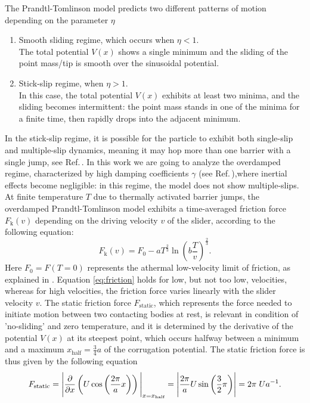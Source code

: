 The Prandtl-Tomlinson model predicts two different patterns of motion depending on the parameter $\eta$
\begin{enumerate}
    \item Smooth sliding regime, which occurs when $\eta < 1$. 
    \\The total potential $V(x)$ shows a single minimum and the sliding of the point mass/tip is smooth over the sinusoidal potential.
    \item Stick-slip regime, when $\eta > 1$. 
    \\In this case, the total potential $V(x)$ exhibits at least two minima, and the sliding becomes intermittent: the point mass stands in one of the minima for a finite time, then rapidly drops into the adjacent minimum.
\end{enumerate}
In the stick-slip regime, it is possible for the particle to exhibit both single-slip and multiple-slip dynamics, meaning it may hop more than one barrier with a single jump, see Ref.\,\cite{PhysRevLett.97.136106}. In this work we are going to analyze  the overdamped regime, characterized by high damping coefficients $\gamma$ (see Ref.\,\cite{Paronuzzi_Ticco_2016}),where inertial
effects become negligible: in this regime, the model does not show multiple-slips.
\\
At finite temperature $T$ due to thermally activated barrier jumps, the overdamped Prandtl-Tomlinson model exhibits a time-averaged friction force $F_\text{k}(v)$ depending on the driving velocity $v$ of the slider, according to the following equation:
\begin{equation}
    F_\text{k} (v) = F_0 - aT^\frac{2}{3} \ln{ \left(b\dfrac{T}{v}\right)}^\frac{2}{3} .
    \label{eq:friction}
\end{equation}
Here $F_0 = F(T=0)$ represents the athermal low-velocity limit of friction, as explained in \cite{vanossi2013}. Equation \eqref{eq:friction} holds for low, but not too low, velocities, whereas for high velocities, the friction force varies linearly with the slider velocity $v$. The static friction force $F_\text{static}$, which represents the force needed to initiate motion between two contacting bodies at rest, is relevant in condition of 'no-sliding' and zero temperature, and it is determined by the derivative of the potential $V(x)$ at its steepest point, which occurs halfway between a minimum and a maximum $x_\text{half} = \frac{3}{4}a$ of the corrugation potential. The static friction force is thus given by the following equation
\begin{equation}
    F_\text{static} = \Bigg\vert\dfrac{\partial }{\partial x} \left(U \cos{\left(\dfrac{2\pi}{a}x\right)}\right)\Bigg\vert_{x=x_\text{half}} = \Bigg\vert \dfrac{2\pi}{a} U \sin{\left(\dfrac{3}{2} \pi\right)}\Bigg\vert = 2 \pi \hspace{0.1cm}Ua^{-1}.
\end{equation}
